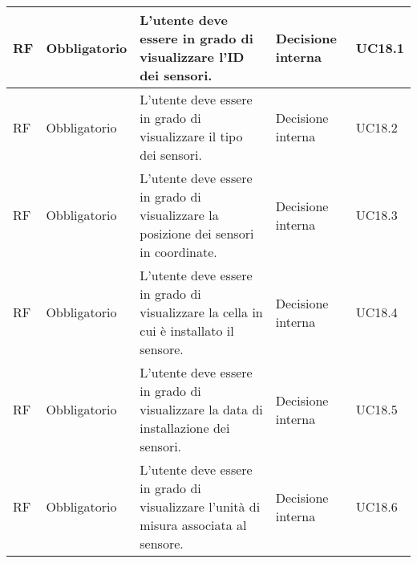\begin{longtable}{|C{1.5cm}|C{2cm}|L{5cm}|C{2cm}|C{1.5cm}|}
    \hline
     RF & Obbligatorio & L'utente deve essere in grado di visualizzare l'ID dei sensori. & Decisione interna  & UC18.1 \\

    \hline
     RF & Obbligatorio & L'utente deve essere in grado di visualizzare il tipo dei sensori. & Decisione interna & UC18.2 \\

    \hline
     RF & Obbligatorio & L'utente deve essere in grado di visualizzare la posizione dei sensori in coordinate. & Decisione interna & UC18.3 \\

    \hline
     RF & Obbligatorio & L'utente deve essere in grado di visualizzare la cella in cui è installato il sensore. & Decisione interna & UC18.4 \\

    \hline
     RF & Obbligatorio & L'utente deve essere in grado di visualizzare la data di installazione dei sensori. & Decisione interna & UC18.5 \\

    \hline
     RF & Obbligatorio & L'utente deve essere in grado di visualizzare l'unità di misura associata al sensore. & Decisione interna & UC18.6 \\
    
    \hline
    
\end{longtable}


